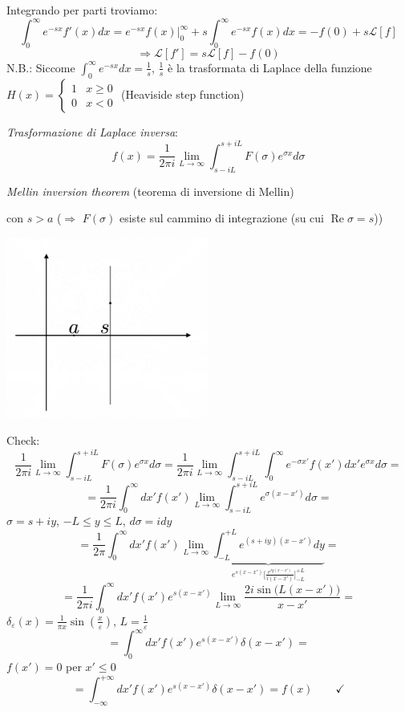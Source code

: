 \documentclass[a4paper,11pt]{report}
\begin{document}
\smallskip

Integrando per parti troviamo:
\[
\int_0^{\infty} e^{-sx} f'(x) dx = e^{-sx} f(x)\Big|_0^\infty + s \int_0^{\infty} e^{-sx} f(x) dx = -f(0) + s\mathcal{L}[f]
\]
\begin{equation}
\Rightarrow \mathcal{L}[f'] = s\mathcal{L}[f] -f(0)
\tag{$\triangle$}
\label{eqtriangle}
\end{equation}
N.B.: Siccome $\int_0^{\infty} e^{-sx} dx = \frac{1}{s}$, $\frac{1}{s}$ \`e la trasformata di Laplace della funzione 
\mbox{$H(x)=\left\{\begin{matrix} 1 & x \geq 0 \\ 0 & x<0 \end{matrix}\right.$} (Heaviside step function)

\medskip

\emph{Trasformazione di Laplace inversa}:
\[
f(x)=\frac{1}{2 \pi i} \lim_{L \to \infty} \int^{s+iL}_{s-iL}F(\sigma) e^{\sigma x} d\sigma
\]
\centerline{\emph{Mellin inversion theorem} (teorema di inversione di Mellin)}

\smallskip

con $s>a$ ($\Rightarrow$ $F(\sigma)$ esiste sul cammino di integrazione (su cui $\operatorname{Re}\sigma=s$))
\begin{center}
\includegraphics[width=0.5\textwidth]{immagini/mellin}
\end{center}
\medskip

Check:
\[
\frac{1}{2 \pi i} \lim_{L \to \infty} \int^{s+iL}_{s-iL}F(\sigma) e^{\sigma x} d\sigma = \frac{1}{2 \pi i} \lim_{L \to \infty} \int^{s+iL}_{s-iL} \int_0^\infty e^{-\sigma x'} f(x') dx' e^{\sigma x} d\sigma =
\]
\[
=\frac{1}{2 \pi i} \int^\infty_0 dx' f(x') \lim_{L \to \infty} \int^{s+iL}_{s-iL} e^{\sigma (x-x')} d\sigma =
\]
$\sigma=s+iy$, $-L\leq y \leq L$, $d\sigma=i dy$
\[
=\frac{1}{2 \pi} \int^\infty_0 dx' f(x') \lim_{L \to \infty} \underbrace{\int^{+L}_{-L} e^{(s+iy)(x-x')} dy }_{e^{s(x-x')}\big[\frac{e^{iy(x-x')}}{i(x-x')}\big]^{+L}_{-L}}=
\]
\[
=\frac{1}{2 \pi i} \int^\infty_0 dx' f(x') e^{s (x-x')} \lim_{L \to \infty} \frac{2 i \sin\big(L(x-x')\big)}{x-x'}=
\]
$\delta_\varepsilon(x)=\frac{1}{\pi x} \sin(\frac{x}{\varepsilon})$, $L=\frac{1}{\varepsilon}$
\[
=\int_0^\infty dx' f(x') e^{s (x-x')} \delta(x-x')=
\]
$f(x')=0$ per $x'\leq0$
\[
=\int_{-\infty}^{+\infty} dx' f(x') e^{s (x-x')} \delta(x-x')=f(x) \qquad \checkmark
\]
\end{document}
